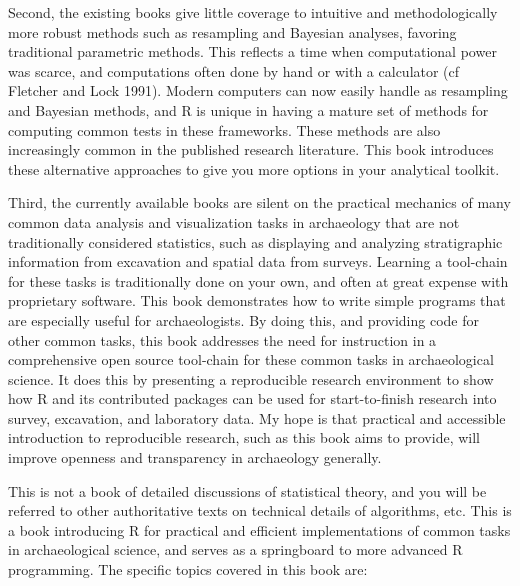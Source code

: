 Second, the existing books give little coverage to intuitive and
methodologically more robust methods such as resampling and Bayesian
analyses, favoring traditional parametric methods. This reflects a time
when computational power was scarce, and computations often done by hand
or with a calculator (cf Fletcher and Lock 1991). Modern computers can
now easily handle as resampling and Bayesian methods, and R is unique in
having a mature set of methods for computing common tests in these
frameworks. These methods are also increasingly common in the published
research literature. This book introduces these alternative approaches
to give you more options in your analytical toolkit.

Third, the currently available books are silent on the practical
mechanics of many common data analysis and visualization tasks in
archaeology that are not traditionally considered statistics, such as
displaying and analyzing stratigraphic information from excavation and
spatial data from surveys. Learning a tool-chain for these tasks is
traditionally done on your own, and often at great expense with
proprietary software. This book demonstrates how to write simple
programs that are especially useful for archaeologists. By doing this,
and providing code for other common tasks, this book addresses the need
for instruction in a comprehensive open source tool-chain for these
common tasks in archaeological science. It does this by presenting a
reproducible research environment to show how R and its contributed
packages can be used for start-to-finish research into survey,
excavation, and laboratory data. My hope is that practical and
accessible introduction to reproducible research, such as this book aims
to provide, will improve openness and transparency in archaeology
generally.

This is not a book of detailed discussions of statistical theory, and
you will be referred to other authoritative texts on technical details
of algorithms, etc. This is a book introducing R for practical and
efficient implementations of common tasks in archaeological science, and
serves as a springboard to more advanced R programming. The specific
topics covered in this book are:

